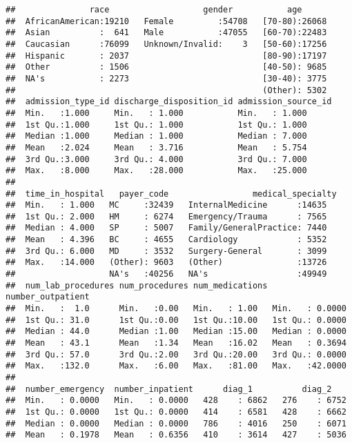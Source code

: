 \documentclass[]{article}
\begin{document}
\begin{verbatim}
##               race                   gender           age       
##  AfricanAmerican:19210   Female         :54708   [70-80):26068  
##  Asian          :  641   Male           :47055   [60-70):22483  
##  Caucasian      :76099   Unknown/Invalid:    3   [50-60):17256  
##  Hispanic       : 2037                           [80-90):17197  
##  Other          : 1506                           [40-50): 9685  
##  NA's           : 2273                           [30-40): 3775  
##                                                  (Other): 5302  
##  admission_type_id discharge_disposition_id admission_source_id
##  Min.   :1.000     Min.   : 1.000           Min.   : 1.000     
##  1st Qu.:1.000     1st Qu.: 1.000           1st Qu.: 1.000     
##  Median :1.000     Median : 1.000           Median : 7.000     
##  Mean   :2.024     Mean   : 3.716           Mean   : 5.754     
##  3rd Qu.:3.000     3rd Qu.: 4.000           3rd Qu.: 7.000     
##  Max.   :8.000     Max.   :28.000           Max.   :25.000     
##                                                                
##  time_in_hospital   payer_code                 medical_specialty
##  Min.   : 1.000   MC     :32439   InternalMedicine      :14635  
##  1st Qu.: 2.000   HM     : 6274   Emergency/Trauma      : 7565  
##  Median : 4.000   SP     : 5007   Family/GeneralPractice: 7440  
##  Mean   : 4.396   BC     : 4655   Cardiology            : 5352  
##  3rd Qu.: 6.000   MD     : 3532   Surgery-General       : 3099  
##  Max.   :14.000   (Other): 9603   (Other)               :13726  
##                   NA's   :40256   NA's                  :49949  
##  num_lab_procedures num_procedures num_medications number_outpatient
##  Min.   :  1.0      Min.   :0.00   Min.   : 1.00   Min.   : 0.0000  
##  1st Qu.: 31.0      1st Qu.:0.00   1st Qu.:10.00   1st Qu.: 0.0000  
##  Median : 44.0      Median :1.00   Median :15.00   Median : 0.0000  
##  Mean   : 43.1      Mean   :1.34   Mean   :16.02   Mean   : 0.3694  
##  3rd Qu.: 57.0      3rd Qu.:2.00   3rd Qu.:20.00   3rd Qu.: 0.0000  
##  Max.   :132.0      Max.   :6.00   Max.   :81.00   Max.   :42.0000  
##                                                                     
##  number_emergency  number_inpatient      diag_1          diag_2     
##  Min.   : 0.0000   Min.   : 0.0000   428    : 6862   276    : 6752  
##  1st Qu.: 0.0000   1st Qu.: 0.0000   414    : 6581   428    : 6662  
##  Median : 0.0000   Median : 0.0000   786    : 4016   250    : 6071  
##  Mean   : 0.1978   Mean   : 0.6356   410    : 3614   427    : 5036  

\end{verbatim}
\end{document}
